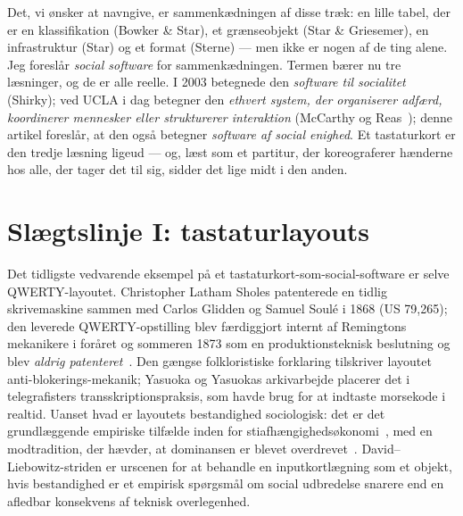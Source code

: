 \documentclass[10pt,letterpaper,twocolumn]{article}
\begin{document}
Det, vi ønsker at navngive, er sammenkædningen af disse træk: en lille tabel, der er en klassifikation (Bowker \& Star), et grænseobjekt (Star \& Griesemer), en infrastruktur (Star) og et format (Sterne) --- men ikke er nogen af de ting alene. Jeg foreslår \emph{social software} for sammenkædningen. Termen bærer nu tre læsninger, og de er alle reelle. I 2003 betegnede den \emph{software til socialitet} (Shirky); ved UCLA i dag betegner den \emph{ethvert system, der organiserer adfærd, koordinerer mennesker eller strukturerer interaktion} (McCarthy og Reas~\citep{sosoft_info}); denne artikel foreslår, at den også betegner \emph{software af social enighed}. Et tastaturkort er den tredje læsning ligeud --- og, læst som et partitur, der koreograferer hænderne hos alle, der tager det til sig, sidder det lige midt i den anden.

\section{Slægtslinje I: tastaturlayouts}
\label{sec:lineage1}

Det tidligste vedvarende eksempel på et tastaturkort-som-social-software er selve QWERTY-layoutet. Christopher Latham Sholes patenterede en tidlig skrivemaskine sammen med Carlos Glidden og Samuel Soulé i 1868 (US 79{,}265); den leverede QWERTY-opstilling blev færdiggjort internt af Remingtons mekanikere i foråret og sommeren 1873 som en produktionsteknisk beslutning og blev \emph{aldrig patenteret}~\citep{yasuoka2011prehistory}. Den gængse folkloristiske forklaring tilskriver layoutet anti-blokerings-mekanik; Yasuoka og Yasuokas arkivarbejde placerer det i telegrafisters transskriptionspraksis, som havde brug for at indtaste morsekode i realtid. Uanset hvad er layoutets bestandighed sociologisk: det er det grundlæggende empiriske tilfælde inden for stiafhængighedsøkonomi~\citep{david1985qwerty,arthur1989competing}, med en modtradition, der hævder, at dominansen er blevet overdrevet~\citep{liebowitz1990fable}. David--Liebowitz-striden er urscenen for at behandle en inputkortlægning som et objekt, hvis bestandighed er et empirisk spørgsmål om social udbredelse snarere end en afledbar konsekvens af teknisk overlegenhed.
\end{document}
